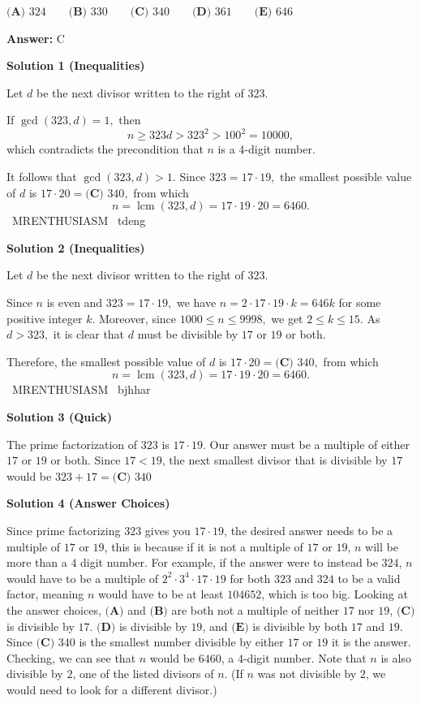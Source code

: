 \begin{enumerate}
 $\textbf{(A) }324 \qquad \textbf{(B) }330 \qquad \textbf{(C) }340 \qquad \textbf{(D) }361 \qquad \textbf{(E) }646 \qquad$

 \textbf{Answer: }C



\textbf{Solution 1 (Inequalities)}

Let $d$ be the next divisor written to the right of $323.$

 If $\gcd(323,d)=1,$ then 
 \[n\geq323d>323^2>100^2=10000,\] which contradicts the precondition that $n$ is a $4$-digit number.

 It follows that $\gcd(323,d)>1.$ Since $323=17\cdot19,$ the smallest possible value of $d$ is $17\cdot20=\boxed{\textbf{(C) } 340},$ from which 
 \[n=\operatorname{lcm}(323,d)=17\cdot19\cdot20=6460.\]~MRENTHUSIASM ~tdeng

 



\textbf{Solution 2 (Inequalities)}

Let $d$ be the next divisor written to the right of $323.$

 Since $n$ is even and $323=17\cdot19,$ we have $n=2\cdot17\cdot19\cdot k=646k$ for some positive integer $k.$ Moreover, since $1000\leq n\leq9998,$ we get $2\leq k\leq15.$ As $d>323,$ it is clear that $d$ must be divisible by $17$ or $19$ or both.

 Therefore, the smallest possible value of $d$ is $17\cdot20=\boxed{\textbf{(C) } 340},$ from which 
 \[n=\operatorname{lcm}(323,d)=17\cdot19\cdot20=6460.\]~MRENTHUSIASM ~bjhhar

 



\textbf{Solution 3 (Quick)}

The prime factorization of $323$ is $17 \cdot 19$. Our answer must be a multiple of either $17$ or $19$ or both. Since $17 < 19$, the next smallest divisor that is divisible by $17$ would be $323 + 17 = \boxed{\textbf{(C) } 340}$




\textbf{Solution 4 (Answer Choices)}

Since prime factorizing $323$ gives you $17 \cdot 19$, the desired answer needs to be a multiple of $17$ or $19$, this is because if it is not a multiple of $17$ or $19$, $n$ will be more than a $4$ digit number. For example, if the answer were to instead be $324$, $n$ would have to be a multiple of $2^2\cdot3^4\cdot17\cdot19$ for both $323$ and $324$ to be a valid factor, meaning $n$ would have to be at least $104652$, which is too big. Looking at the answer choices, $\textbf{(A)}$ and $\textbf{(B)}$ are both not a multiple of neither $17$ nor $19$, $\textbf{(C)}$ is divisible by $17$. $\textbf{(D)}$ is divisible by $19$, and $\textbf{(E)}$ is divisible by both $17$ and $19$. Since $\boxed{\textbf{(C) } 340}$ is the smallest number divisible by either $17$ or $19$ it is the answer. Checking, we can see that $n$ would be $6460$, a $4$-digit number. Note that $n$ is also divisible by $2$, one of the listed divisors of $n$. (If $n$ was not divisible by $2$, we would need to look for a different divisor.)


\end{enumerate}
